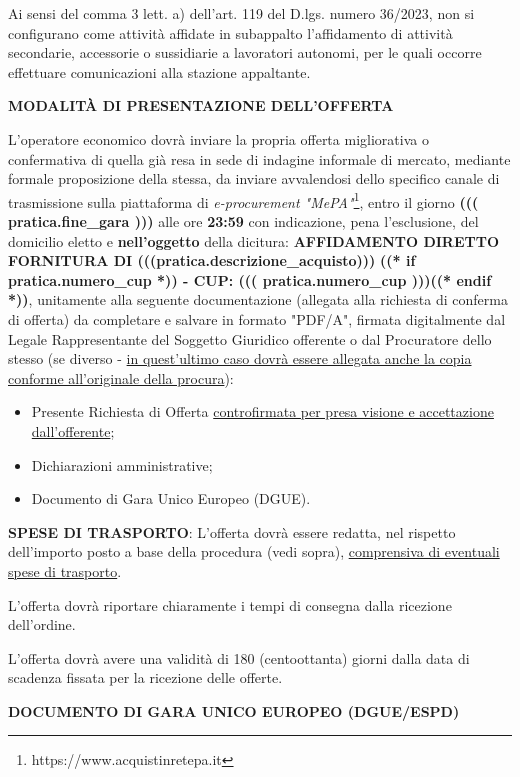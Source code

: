 Ai sensi del comma 3 lett. a) dell'art. 119 del D.lgs. numero 36/2023,
non si configurano come attività affidate in subappalto l'affidamento
di attività secondarie, accessorie o sussidiarie a lavoratori autonomi,
per le quali occorre effettuare comunicazioni alla stazione appaltante.

\textbf{MODALITÀ DI PRESENTAZIONE DELL'OFFERTA}

L'operatore economico dovrà inviare la propria offerta migliorativa
o confermativa di quella già resa in sede di indagine informale
di mercato, mediante formale proposizione della stessa, da inviare
avvalendosi dello specifico canale di trasmissione sulla piattaforma di
\textit{e-procurement "MePA"}\footnote{https://www.acquistinretepa.it},
entro il giorno \textbf{((( pratica.fine_gara )))} alle ore
\textbf{23:59} con indicazione, pena l'esclusione, del domicilio
eletto e \textbf{nell'oggetto} della dicitura: \textbf{AFFIDAMENTO
DIRETTO FORNITURA DI (((pratica.descrizione_acquisto)))}
\textbf{((* if pratica.numero_cup *)) - CUP: ((( pratica.numero_cup )))((* endif *))},
unitamente alla seguente documentazione (allegata alla richiesta di conferma di offerta)
da completare e salvare in formato "PDF/A", firmata digitalmente dal
Legale Rappresentante del Soggetto Giuridico offerente o dal Procuratore
dello stesso (se diverso - \ul{in quest'ultimo caso dovr\`a essere
allegata anche la copia conforme all'originale della procura}):

\begin{itemize}
\item Presente Richiesta di Offerta \ul{controfirmata per presa visione e accettazione dall'offerente};
\item Dichiarazioni amministrative;
\item Documento di Gara Unico Europeo (DGUE).
\end{itemize}

\textbf{SPESE DI TRASPORTO}: L'offerta dovrà essere redatta, nel
rispetto dell'importo posto a base della procedura (vedi sopra),
\ul{comprensiva di eventuali spese di trasporto}.

L'offerta dovrà riportare chiaramente i tempi di consegna dalla
ricezione dell'ordine.

L'offerta dovrà avere una validità di 180 (centoottanta) giorni
dalla data di scadenza fissata per la ricezione delle offerte.

\textbf{DOCUMENTO DI GARA UNICO EUROPEO (DGUE/ESPD)}

